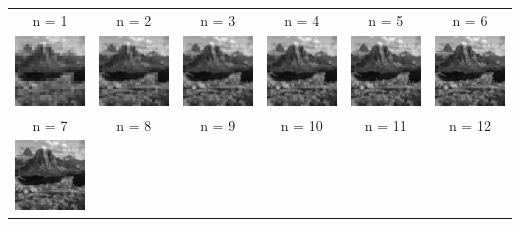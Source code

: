 \documentclass{article}
\begin{document}
\begin{center}
\begin{tabular}{|c|c|c|c|c|c|}
\hline
n = 1 &
n = 2 &
n = 3 &
n = 4 &
n = 5 &
n = 6 \\
\includegraphics[width=2cm]{../imgs/output/test_progressive/out01.png} &
\includegraphics[width=2cm]{../imgs/output/test_progressive/out02.png} &
\includegraphics[width=2cm]{../imgs/output/test_progressive/out03.png} &
\includegraphics[width=2cm]{../imgs/output/test_progressive/out04.png} &
\includegraphics[width=2cm]{../imgs/output/test_progressive/out05.png} &
\includegraphics[width=2cm]{../imgs/output/test_progressive/out06.png} \\
\hline
n = 7 &
n = 8 &
n = 9 &
n = 10 &
n = 11 &
n = 12 \\
\includegraphics[width=2cm]{../imgs/output/test_progressive/out07.png} &

\end{tabular}
\end{center}
\end{document}
